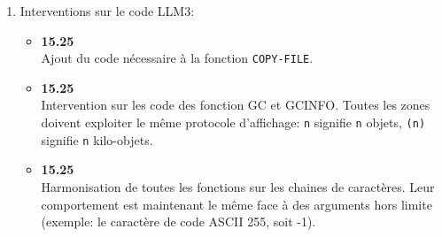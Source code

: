 \begin {enumerate}
\begin {itemize}
\item {\bf 15.25} \\
Int\'{e}gration du portage OS/2 (introduction de
code C en particulier). 

\item {\bf 15.25} \\
R\'{e}arrangement du fichier {\tt lelisp.c} en vue de facilit\'{e} sa
maintenance
et son \'{e}volution. L'id\'{e}e est d'introduire des fichiers C d\'{e}pendants
machine ({\it  exemple: lelisp/sun/C/Execore.c, lelisp/sun/C/Machine.h}) . 
Le fichier {\tt .c} contient tout le code tr\`{e}s sp\'{e}cifique au portage
(mode execore, getglobal, ...), le fichier {\tt .h} contient tous les
{\tt include}s propres \`{a} ce portage. Tous ces fichiers sont engendr\'{e}s
automatiquement. 

\item {\bf 15.25} \\
Introduction d'un processus fant\^{o}me \`{a} la {\tt lelispgo} permettant
de r\'{e}aliser des appels syst\`{e}mes sans exploser n encombrement
m\'{e}moire, sur les machines ne disposant pas de VFORK. Ce processus
est lanc\'{e} d\`{e}s le d\'{e}marrage de \LeLisp\ , et c'est lui qui est
utiliser pour {\it forker} lors d'appels syst\`{e}me tels que
COMLINE. Cette possibilit\'{e}e d\'{e}pend du flag de compilation {\tt
LLGHOSTPROC} et n'est pas op\'{e}rationnelle sur tous les portages.

\item {\bf 15.25} \\
Ajout de la fonction FCOPY en C, pour l'impl\'{e}mentation de la fonction
lisp COPYFILE.
\end {itemize}

\item Interventions sur le code LLM3:

\begin {itemize}

\item {\bf 15.25} \\
Ajout du code n\'{e}cessaire \`{a} la fonction {\tt COPY-FILE}.

\item {\bf 15.25} \\
Intervention sur les code des fonction GC et GCINFO. Toutes les zones
doivent exploiter le m\^{e}me protocole d'affichage: {\tt n} signifie
{\tt n} objets, {\tt (n)} signifie {\tt n} kilo-objets. 

\item {\bf 15.25} \\
Harmonisation de toutes les fonctions sur les chaines de caract\`{e}res.
Leur comportement est maintenant le m\^{e}me face \`{a} des arguments hors
limite (exemple: le caract\`{e}re de code ASCII 255, soit -1).


\end{itemize}
\end{enumerate}
